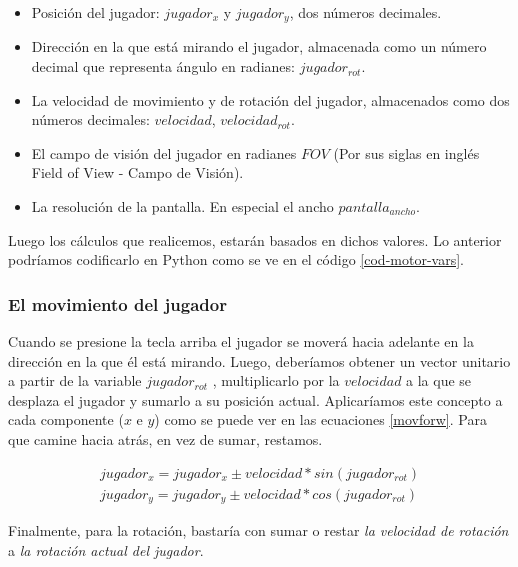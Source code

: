 \begin{itemize}
	\item Posición del jugador: $jugador_x$ y $jugador_y$, dos números decimales.
	\item Dirección en la que está mirando el jugador, almacenada como un número decimal que representa ángulo en radianes: $jugador_{rot}$.
	\item La velocidad de movimiento y de rotación del jugador, almacenados como dos números decimales: $velocidad$,  $velocidad_{rot}$. 
	\item El campo de visión del jugador en radianes $FOV$ (Por sus siglas en inglés Field of View - Campo de Visión).
	\item La resolución de la pantalla. En especial el ancho $pantalla_{ancho}$.
\end{itemize}

Luego los cálculos que realicemos, estarán basados en dichos valores. Lo anterior podríamos codificarlo en Python como se ve en el código \ref{cod-motor-vars}.



\subsubsection{El movimiento del jugador}

Cuando se presione la tecla arriba el jugador se moverá hacia adelante en la dirección en la que él está mirando. Luego, deberíamos obtener un vector unitario a partir de la variable $jugador_{rot}$ , multiplicarlo por la $velocidad$ a la que se desplaza el jugador y sumarlo a su posición actual. Aplicaríamos este concepto a cada componente ($x$ e $y$) como se puede ver en las ecuaciones \ref{movforw}. Para que camine hacia atrás, en vez de sumar, restamos. 

\begin{equation}
\begin{aligned}
\label{movforw}
jugador_x = jugador_x \pm velocidad * sin(jugador_{rot})  \\
jugador_y = jugador_y \pm velocidad * cos(jugador_{rot})
\end{aligned}
\end{equation}

Finalmente, para la rotación, bastaría con sumar o restar \emph{la velocidad de rotación} a \emph{la rotación actual del jugador}.

